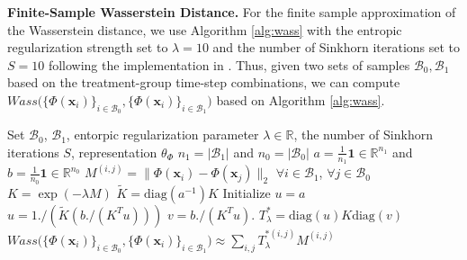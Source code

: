\documentclass{article}
\newcommand{\xv}{{\mathbf x}}
\begin{document}
{
\textbf{Finite-Sample Wasserstein Distance.}
For the finite sample approximation of the Wasserstein distance, we use Algorithm \ref{alg:wass} with the entropic regularization strength set to $\lambda=10$ and the number of Sinkhorn iterations set to $S=10$ following the implementation in \cite{cuturi2014wass,assaad2021balancingweights}. Thus, given two sets of samples $\mathcal{B}_{0}, \mathcal{B}_{1}$ based on the treatment-group time-step combinations, we can compute $Wass\big( \{\Phi(\xv_{i}) \}_{i\in \mathcal{B}_{0}} , \{\Phi(\xv_{i}) \}_{i\in \mathcal{B}_{1}}  \big)$ based on Algorithm \ref{alg:wass}.
}
\begin{center}
    \begin{minipage}{0.75\linewidth}
        \begin{algorithm}[H]
        	\caption{Pseudo-code for Finite Sample Wasserstein Distance}
        	\label{alg:wass}
        	\begin{algorithmic}
        	     Set $\mathcal{B}_{0}$, $\mathcal{B}_{1}$, entorpic regularization parameter $\lambda \in \mathbb{R}$, the number of Sinkhorn iterations $S$, representation $\theta_{\Phi}$
        	    \STATE $n_{1} = |\mathcal{B}_{1}|$ and $n_{0} = |\mathcal{B}_{0}|$
        	    \STATE $a = \frac{1}{n_{1}} \mathbf{1} \in \mathbb{R}^{n_{1}}$ and $b = \frac{1}{n_{0}} \mathbf{1} \in \mathbb{R}^{n_{0}}$
        	    \STATE $M^{(i,j)} = \| \Phi(\xv_{i}) - \Phi(\xv_{j})  \|_{2}$ $\forall{i}\in \mathcal{B}_{1}$, $\forall{j}\in \mathcal{B}_{0}$
        	    \STATE $K = \exp(-\lambda M)$
        	    \STATE $\tilde{K} = \text{diag}(a^{-1}) K$
        	    \STATE Initialize $u = a$
        	        \STATE $u = 1. / (\tilde{K} (b./(K^{T}u)) )$
        		\ENDFOR
        		\STATE $v=b./(K^{T}u).$
        		\STATE $T^{*}_{\lambda} = \text{diag}(u) K \text{diag}(v)$
        		 $Wass\big( \{\Phi(\xv_{i}) \}_{i\in \mathcal{B}_{0}} , \{\Phi(\xv_{i}) \}_{i\in \mathcal{B}_{1}}  \big) \approx \sum_{i,j} T^{* (i,j)}_{\lambda} M^{(i,j)}$
        	\end{algorithmic}
        \end{algorithm}
    \end{minipage}
\end{center}
\end{document}
